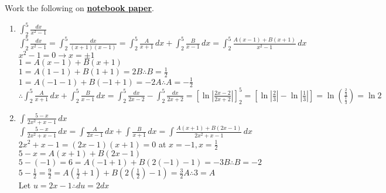 \documentclass[10pt, letterpaper]{report}
\begin{document}
Work the following on \textbf{\underline{notebook paper}}.
\begin{enumerate}
  \item{$\int_{2}^{5}{\frac{dx}{x^{2}-1}}$} \\
  
    $\int_{2}^{5}{\frac{dx}{x^{2}-1}}=
    \int_{2}^{5}{\frac{dx}{(x+1)(x-1)}}=
    \int_{2}^{5}{\frac{A}{x+1}}\,dx+\int_{2}^{5}{\frac{B}{x-1}}\,dx=
    \int_{2}^{5}{\frac{A(x-1)+B(x+1)}{x^{2}-1}}\,dx$ \\
    
    $x^{2}-1=0\rightarrow x=\pm 1$ \\
    
    $1 = A(x-1)+B(x+1)$ \\
    
    $1 = A(1-1)+B(1+1) = 2B\therefore B=\frac{1}{2}$ \\
    
    $1= A(-1-1)+B(-1+1) = -2A\therefore A=-\frac{1}{2}$ \\
    
    $\therefore \int_{2}^{5}{\frac{A}{x+1}}\,dx+\int_{2}^{5}{\frac{B}{x-1}}\,dx=
    \int_{2}^{5}{\frac{dx}{2x-2}}-\int_{2}^{5}{\frac{dx}{2x+2}}=
    \left[\ln{\left|\frac{2x-2}{2x+2}\right|}\right]_{2}^{5}=
    \left[\ln{\left|\frac{2}{3}\right|}-\ln{\left|\frac{1}{3}\right|}\right]=
    \ln{\left(\frac{\frac{2}{3}}{\frac{1}{3}}\right)}=
    \ln{2}$
    
  \item{$\int{\frac{5-x}{2x^{2}+x-1}}\,dx$} \\
  
    $\int{\frac{5-x}{2x^{2}+x-1}}\,dx=
    \int{\frac{A}{2x-1}}\,dx+\int{\frac{B}{x+1}}\,dx=
    \int{\frac{A(x+1)+B(2x-1)}{2x^{2}+x-1}}\,dx$ \\
    
    $2x^{2}+x-1=(2x-1)(x+1)=0$ at $x=-1, x=\frac{1}{2}$ \\
    
    $5-x=A(x+1)+B(2x-1)$ \\
    
    $5-(-1)=6=A(-1+1)+B(2(-1)-1)=-3B\therefore B=-2$ \\
    
    $5-\frac{1}{2}=\frac{9}{2}=A\left(\frac{1}{2}+1\right)+B\left(2\left(\frac{1}{2}\right)-1\right)=\frac{3}{2}A\therefore 3=A$ \\ 
    
    Let $u=2x-1\therefore du=2dx$ \\
    

\end{enumerate}
\end{document}
